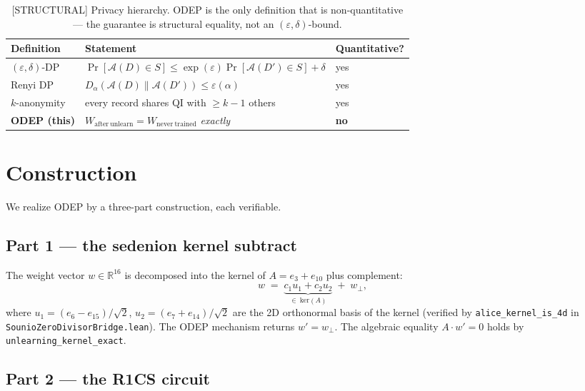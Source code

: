 \documentclass{article}
\begin{document}
\begin{table}[h]
\centering
\caption{[STRUCTURAL] Privacy hierarchy.  ODEP is the only definition that is
         non-quantitative — the guarantee is structural equality, not
         an $(\varepsilon, \delta)$-bound.}
\label{tab:hierarchy}
\begin{tabular}{lll}
\toprule
Definition & Statement & Quantitative? \\
\midrule
$(\varepsilon, \delta)$-DP & $\Pr[\mathcal{A}(D) \in S] \le \exp(\varepsilon) \Pr[\mathcal{A}(D') \in S] + \delta$ & yes \\
Renyi DP                  & $D_\alpha(\mathcal{A}(D) \| \mathcal{A}(D')) \le \varepsilon(\alpha)$                 & yes \\
$k$-anonymity             & every record shares QI with $\ge k-1$ others                                      & yes \\
\textbf{ODEP (this)}       & $W_{\mathrm{after\ unlearn}} = W_{\mathrm{never\ trained}}$ \emph{exactly}         & \textbf{no} \\
\bottomrule
\end{tabular}
\end{table}

\section{Construction}

We realize ODEP by a three-part construction, each verifiable.

\subsection{Part 1 --- the sedenion kernel subtract}

The weight vector $w \in \mathbb{R}^{16}$ is decomposed into the
kernel of $A = e_3 + e_{10}$ plus complement:
\[
  w \;=\; \underbrace{c_1 u_1 + c_2 u_2}_{\in\ \mathrm{ker}(A)} \;+\; w_\perp,
\]
where $u_1 = (e_6 - e_{15})/\sqrt{2}$, $u_2 = (e_7 + e_{14})/\sqrt{2}$
are the 2D orthonormal basis of the kernel (verified by
\texttt{alice\_kernel\_is\_4d} in
\texttt{SounioZeroDivisorBridge.lean}).  The ODEP mechanism returns
$w' = w_\perp$.  The algebraic equality $A \cdot w' = 0$ holds by
\texttt{unlearning\_kernel\_exact}.

\subsection{Part 2 --- the R1CS circuit}
\end{document}
